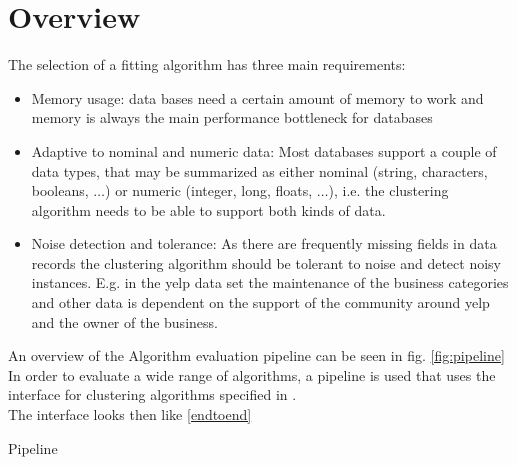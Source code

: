 \section{Overview}\label{\positionnumber}
The selection of a fitting algorithm has three main requirements:
\begin{itemize}
    \item Memory usage: data bases need a certain amount of memory to work and memory is always the main performance bottleneck for databases
    \item Adaptive to nominal and numeric data: Most databases support a couple of data types, that may be summarized as either nominal (string, characters, booleans, $\dots$) or numeric (integer, long, floats, $\dots$), i.e. the clustering algorithm needs to be able to support both kinds of data.
    \item Noise detection and tolerance: As there are frequently missing fields in data records the clustering algorithm should be tolerant to noise and detect noisy instances. E.g. in the yelp data set the maintenance of the business categories and other data is dependent on the support of the community around yelp and the owner of the business.
\end{itemize}
An overview of the Algorithm evaluation pipeline can be seen in fig. \ref{fig:pipeline}
In order to evaluate a wide range of algorithms, a pipeline is used that uses the interface for clustering algorithms specified in . \\
The interface looks then like \ref{endtoend}
\begin{algorithm}[h]
\caption{Pipeline}\label{endtoend}
\end{algorithm}

